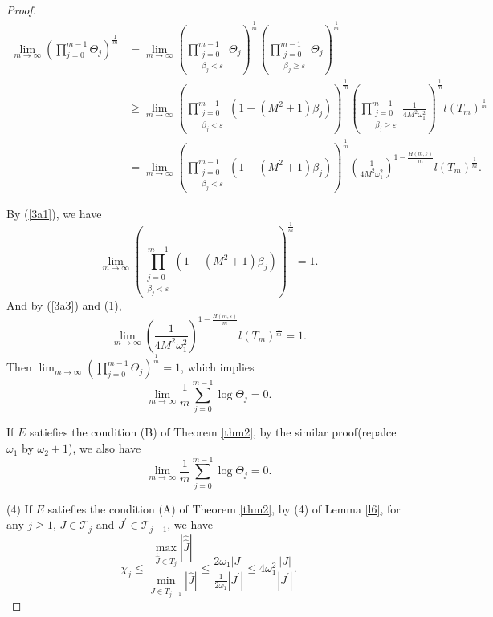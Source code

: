 \documentclass[reqno]{amsart}
\theoremstyle{plain}
\theoremstyle{definition}
\theoremstyle{remark}
\numberwithin{equation}{section} \DeclareMathOperator\intr{int}
\begin{document}
\begin{proof}
\begin{equation*}
\begin{aligned}
\lim_{m \to \infty} ( \prod_{j  = 0}^{m-1}\Theta_j)^{\frac{1}{m} } & =\lim_{m \to \infty} ( \prod_{\substack{j  = 0\\\beta_j<\varepsilon }}^{m-1}\Theta_j)^{\frac{1}{m} }( \prod_{\substack{j  = 0\\\beta_j\ge\varepsilon }}^{m-1}\Theta_j)^{\frac{1}{m} }\\
&\ge  \lim_{m \to \infty}(\prod_{\substack{j  = 0\\\beta_j<\varepsilon }}^{m-1}(1-(M^2+1)\beta_j))^{\frac{1}{m} }( \prod_{\substack{j  = 0\\\beta_j\ge\varepsilon }}^{m-1}\frac{1}{4M^2\omega_1^2} )^{\frac{1}{m} }l(T_m)^{\frac{1}{m} } \\
&=\lim_{m \to \infty}(\prod_{\substack{j  = 0\\\beta_j<\varepsilon }}^{m-1}(1-(M^2+1)\beta_j))^{\frac{1}{m} }(\frac{1}{4M^2\omega_1^2} )^{1-\frac{H(m,\varepsilon )}{m} }l(T_m)^{\frac{1}{m} }.
\end{aligned}
\end{equation*}

By (\ref{3a1}), we have $$\lim_{m \to \infty}(\prod_{\substack{j  = 0\\\beta_j<\varepsilon }}^{m-1}(1-(M^2+1)\beta_j))^{\frac{1}{m} }=1.$$
And by (\ref{3a3}) and (1), $$\lim_{m \to \infty}(\frac{1}{4M^2\omega_1^2} )^{1-\frac{H(m,\varepsilon )}{m} }l(T_m)^{\frac{1}{m} }=1.$$
Then $\lim_{m \to \infty} ( \prod_{j  = 0}^{m-1}\Theta_j)^{\frac{1}{m} }=1$, which implies
\begin{equation*}
\lim_{m \to \infty}\frac{1}{m} \sum_{j=0}^{m-1}\log \Theta_j=0 .
\end{equation*}




If $E$ satiefies the condition {\rm(B)} of Theorem {\rm\ref{thm2}}, by the similar proof(repalce $\omega_1$ by $\omega_2+1$), we also have
\begin{equation*}
\lim_{m \to \infty}\frac{1}{m} \sum_{j=0}^{m-1}\log \Theta_j=0 .
\end{equation*}




(4) If $E$ satiefies the condition {\rm(A)} of Theorem {\rm\ref{thm2}}, by (4) of Lemma \ref{l6}, for any $j\ge 1$, $J\in \mathcal{T}_j$ and $J^{\prime}\in \mathcal{T}_{j-1}$, we have
\begin{equation*}
\chi_j\le\frac{\max_{\hat{\hat{J}}\in T_j}\left | \hat{\hat{J}} \right | }{\min_{\hat{J}\in T_{j-1}}\left | \hat{J} \right |}\le\frac{2\omega_1\left | J \right | }{\frac{1}{2\omega_1} \left |J^{\prime} \right |}\le 4\omega_1^2\frac{\left | J \right |}{\left |J^{\prime} \right |}.
\end{equation*}



\end{proof}
\end{document}
